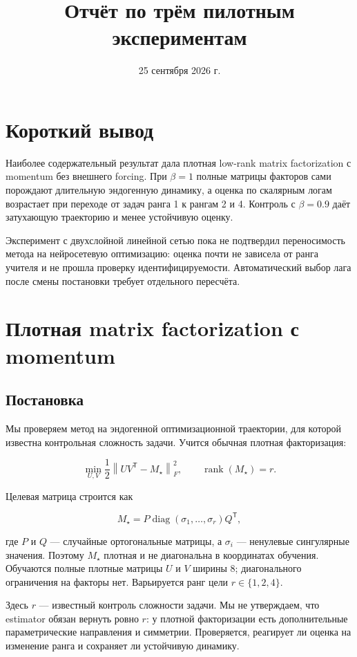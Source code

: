 ﻿\documentclass[11pt,a4paper]{article}
\title{Отчёт по трём пилотным экспериментам}
\author{}
\date{25 сентября 2026 г.}
\begin{document}
\maketitle

\section*{Короткий вывод}

Наиболее содержательный результат дала плотная low-rank matrix factorization с momentum без внешнего forcing. При $\beta=1$ полные матрицы факторов сами порождают длительную эндогенную динамику, а оценка по скалярным логам возрастает при переходе от задач ранга 1 к рангам 2 и 4. Контроль с $\beta=0.9$ даёт затухающую траекторию и менее устойчивую оценку.

Эксперимент с двухслойной линейной сетью пока не подтвердил переносимость метода на нейросетевую оптимизацию: оценка почти не зависела от ранга учителя и не прошла проверку идентифицируемости. Автоматический выбор лага после смены постановки требует отдельного пересчёта.

\section{Плотная matrix factorization с momentum}

\subsection{Постановка}

Мы проверяем метод на эндогенной оптимизационной траектории, для которой известна контрольная сложность задачи. Учится обычная плотная факторизация:

\[
    \min_{U,V}\frac12\left\|UV^{\mathsf T}-M_\star\right\|_F^2,
    \qquad \operatorname{rank}(M_\star)=r.
\]

Целевая матрица строится как

\[
    M_\star=P\operatorname{diag}(\sigma_1,\ldots,\sigma_r)Q^{\mathsf T},
\]

где $P$ и $Q$ --- случайные ортогональные матрицы, а $\sigma_i$ --- ненулевые сингулярные значения. Поэтому $M_\star$ плотная и не диагональна в координатах обучения. Обучаются полные плотные матрицы $U$ и $V$ ширины 8; диагонального ограничения на факторы нет. Варьируется ранг цели $r\in\{1,2,4\}$.

Здесь $r$ --- известный контроль сложности задачи. Мы не утверждаем, что estimator обязан вернуть ровно $r$: у плотной факторизации есть дополнительные параметрические направления и симметрии. Проверяется, реагирует ли оценка на изменение ранга и сохраняет ли устойчивую динамику.
\end{document}
